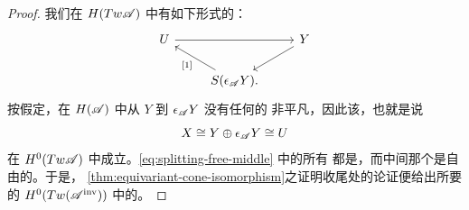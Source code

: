 \begin{proof}
我们在 $H(Tw\mathscr{A})$ 中有如下形式的\trExactTriangle：
\begin{equation*}
\begin{tikzcd}
U \ar[rr] && Y \ar[dl] \\
& S(\epsilon_{\scr{A}}Y). \ar[ul,"{[1]}"] &
\end{tikzcd}
\end{equation*}
按假定，在 $H(\mathscr{A})$ 中从 $Y$ 到 $\epsilon_{\mathscr{A}}Y$ 没有任何\trDegree{}的
非平凡\trMorphism，因此该\trExactTriangle{}\trSplitting，也就是说
\begin{equation}\label{eq:splitting-free-middle}
X\cong Y\oplus\epsilon_{\mathscr{A}}Y\cong U
\end{equation}
在 $H^0(Tw\mathscr{A})$ 中成立。\eqref{eq:splitting-free-middle} 中的所有\trObject{}%
都是\trEquivariant\trTwistedComplex，而中间那个是自由的。于是，%
\cref{thm:equivariant-cone-isomorphism}之证明收尾处的论证便给出所要的
$H^0(Tw(\mathscr{A}^{\mathrm{inv}}))$ 中的\trIsomorphism。


\end{proof}
